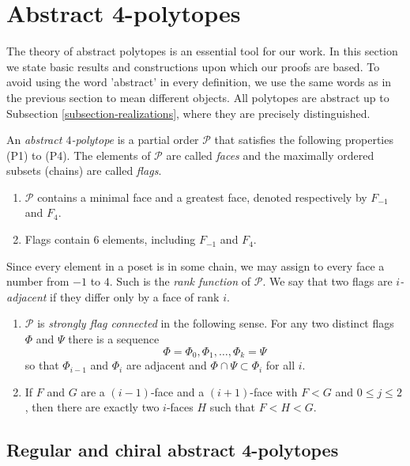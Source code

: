 \documentclass{amsart}
\begin{document}
\section{Abstract 4-polytopes}
\label{section-abstract-4-polytopes}

The theory of abstract polytopes is an essential tool for our work. In this
section we state basic results and constructions upon which our proofs are
based. To avoid using the word 'abstract' in every definition, we use the same
words as in the previous section to mean different objects. All polytopes are
abstract up to Subsection \ref{subsection-realizations}, where they are
precisely distinguished.
	
An \textit{abstract $4$-polytope} is a partial order $\mathcal{P}$ that
satisfies the following properties (P1) to (P4). The elements of $\mathcal{P}$
are called \textit{faces} and the maximally ordered subsets (chains) are called
\textit{flags}.

\begin{enumerate}
\item[(P1)]\label{P1} $\mathcal{P}$ contains a minimal face and a greatest face, 
denoted respectively by $F_{-1}$ and $F_4$.
\item[(P2)]\label{P2} Flags contain $6$ elements, including $F_{-1}$ and $F_4$.
\end{enumerate}

Since every element in a poset is in some chain, we may assign to every face a
number from $-1$ to $4$. Such is the \textit{rank function} of $\mathcal{P}$. We
say that two flags are \textit{$i$-adjacent} if they differ only by a face of
rank $i$.

\begin{enumerate}
\item[(P3)]\label{P3} $\mathcal{P}$ is \textit{strongly flag connected} in the following 
sense. For any two distinct flags $\Phi$ and $\Psi$ there is a sequence
$$\Phi=\Phi_0,\Phi_1,\ldots,\Phi_k=\Psi$$
so that $\Phi_{i-1}$ and $\Phi_i$ are adjacent and $\Phi\cap\Psi\subset\Phi_i$ for all $i$.
\item[(P4)]\label{P4} If $F$ and $G$ are a $(i-1)$-face and a $(i+1)$-face 
with $F<G$ and $0\leq j\leq2$, then there are exactly two $i$-faces $H$ such that $F<H<G$.
\end{enumerate}
	
\subsection{Regular and chiral abstract 4-polytopes}
\label{subsection-regular-and-chiral-abstract-4-polyopes}
\end{document}
